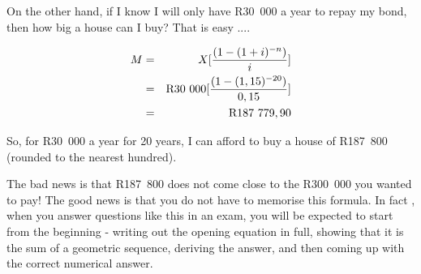 On the other hand, if I know I will only have R30~000 a year to repay my bond, then how big a house can I buy? That is easy ....

\begin{eqnarray*}
M &=& X [\frac{(1-(1+i)^{-n})}{i}]\\
&=& \rm{R}30~000 [\frac{(1-(1,15)^{-20})}{0,15}]\\
&=& \rm{R}187~779,90
\end{eqnarray*}

So, for R30~000 a year for 20 years, I can afford to buy a house of R187~800 (rounded to the nearest hundred).

The bad news is that R187~800 does not come close to the R300~000 you wanted to pay! The good news is that you do not have to memorise this formula. In fact , when you answer questions like this in an exam, you will be expected to start from the beginning - writing out the opening equation in full, showing that it is the sum of a geometric sequence, deriving the answer, and then coming up with the correct numerical answer.

